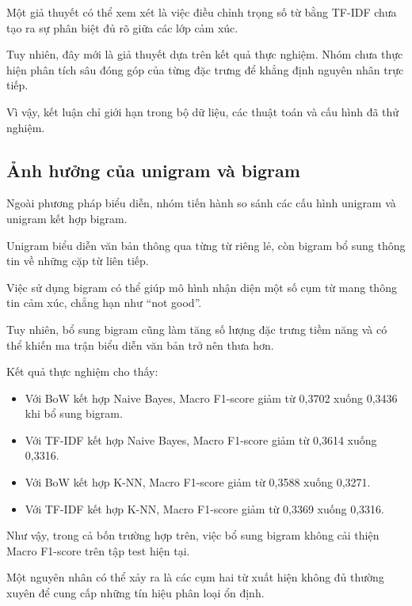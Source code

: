 Một giả thuyết có thể xem xét là việc điều chỉnh
trọng số từ bằng TF-IDF chưa tạo ra sự phân biệt
đủ rõ giữa các lớp cảm xúc.

Tuy nhiên, đây mới là giả thuyết dựa trên kết quả
thực nghiệm. Nhóm chưa thực hiện phân tích sâu
đóng góp của từng đặc trưng để khẳng định nguyên
nhân trực tiếp.

Vì vậy, kết luận chỉ giới hạn trong bộ dữ liệu,
các thuật toán và cấu hình đã thử nghiệm.


\subsection{Ảnh hưởng của unigram và bigram}

Ngoài phương pháp biểu diễn, nhóm tiến hành
so sánh các cấu hình unigram và unigram kết
hợp bigram.

Unigram biểu diễn văn bản thông qua từng từ
riêng lẻ, còn bigram bổ sung thông tin về
những cặp từ liên tiếp.

Việc sử dụng bigram có thể giúp mô hình nhận
diện một số cụm từ mang thông tin cảm xúc,
chẳng hạn như ``not good''.

Tuy nhiên, bổ sung bigram cũng làm tăng
số lượng đặc trưng tiềm năng và có thể khiến
ma trận biểu diễn văn bản trở nên thưa hơn.

Kết quả thực nghiệm cho thấy:

\begin{itemize}

    \item Với BoW kết hợp Naive Bayes,
    Macro F1-score giảm từ 0,3702 xuống
    0,3436 khi bổ sung bigram.

    \item Với TF-IDF kết hợp Naive Bayes,
    Macro F1-score giảm từ 0,3614 xuống
    0,3316.

    \item Với BoW kết hợp K-NN,
    Macro F1-score giảm từ 0,3588 xuống
    0,3271.

    \item Với TF-IDF kết hợp K-NN,
    Macro F1-score giảm từ 0,3369 xuống
    0,3316.

\end{itemize}

Như vậy, trong cả bốn trường hợp trên,
việc bổ sung bigram không cải thiện
Macro F1-score trên tập test hiện tại.

Một nguyên nhân có thể xảy ra là các cụm
hai từ xuất hiện không đủ thường xuyên
để cung cấp những tín hiệu phân loại ổn định.

